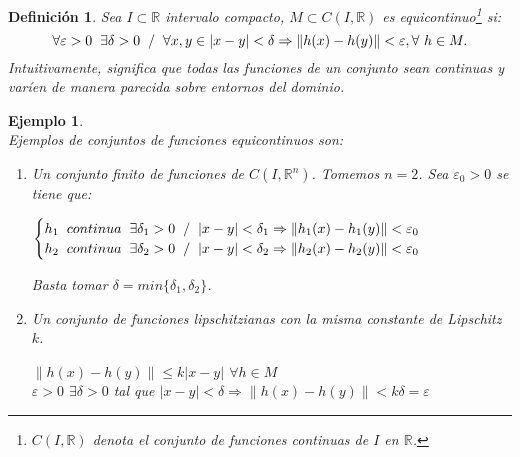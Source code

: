 \documentclass[11pt]{article}
\newcommand{\iindex}[1]{\emph{#1}\index{#1}}
\theoremstyle{theorem-style}  %
\theoremstyle{definition-style}
\newtheorem{definition}{Definición}[section]
\theoremstyle{example-style}
\newtheorem{example}{Ejemplo}[section]
\providecommand{\norm}[1]{\left\lVert#1\right\rVert} %
\begin{document}
\begin{definition}
	Sea $I \subset \mathbb{R}$ intervalo compacto, $M \subset C(I, \mathbb{R})$ es \iindex{equicontinuo}\footnote{ $ C(I, \mathbb{R})$ denota el conjunto de funciones continuas de $ I $ en $ \mathbb{R} $.} si:
	\[\forall \varepsilon > 0 \hspace{0,2cm} \exists \delta > 0 \hspace{0,2cm} / \hspace{0,2cm} \forall x, y\in |x-y| < \delta \Rightarrow \norm{h(x) - h(y)} < \varepsilon, \forall \ h \in M.\]
	Intuitivamente, significa que todas las funciones de un conjunto sean continuas y varíen de manera parecida sobre entornos del dominio.
\end{definition}
\begin{example} \ \\
	Ejemplos de conjuntos de funciones equicontinuos son:
	\begin{enumerate}
		\item Un conjunto finito de funciones de $C(I, \mathbb{R}^n)$. Tomemos $n = 2$. Sea $\varepsilon_0 > 0$ se tiene que:
		\begin{center}
			$\begin{cases}
			h_1 \hspace{0,2cm} continua \hspace{0,2cm} \exists \delta_1 > 0 \hspace{0,2cm} / \hspace{0,2cm} |x-y|<\delta_1 \Rightarrow \norm{h_1(x) - h_1(y)} < \varepsilon_0 \\
			h_2 \hspace{0,2cm} continua \hspace{0,2cm} \exists \delta_2 > 0 \hspace{0,2cm} / \hspace{0,2cm} |x-y|<\delta_2 \Rightarrow \norm{h_2(x) - h_2(y)} < \varepsilon_0
			\end{cases}$
		\end{center}
		Basta tomar $\delta = min\{\delta_1, \delta_2\}$.
		\item Un conjunto de funciones lipschitzianas con la misma constante de Lipschitz $k$.
		\begin{center}
			$\norm{h(x) - h(y)}\leq k|x-y|$ $\forall h \in M$ \\
			$\varepsilon > 0$ $\exists \delta > 0$ tal que $|x-y|<\delta \Rightarrow \norm{h(x) - h(y)} < k\delta = \varepsilon$
		\end{center}
	\end{enumerate}
\end{example}
\end{document}
